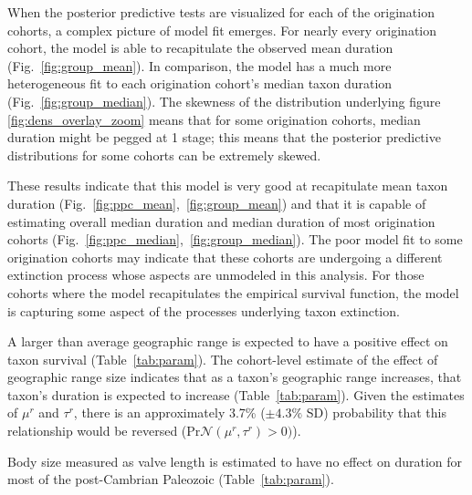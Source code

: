 \documentclass[11pt]{article}
\begin{document}
When the posterior predictive tests are visualized for each of the origination cohorts, a complex picture of model fit emerges. For nearly every origination cohort, the model is able to recapitulate the observed mean duration (Fig.~\ref{fig:group_mean}). In comparison, the model has a much more heterogeneous fit to each origination cohort's median taxon duration (Fig.~\ref{fig:group_median}). The skewness of the distribution underlying figure \ref{fig:dens_overlay_zoom} means that for some origination cohorts, median duration might be pegged at 1 stage; this means that the posterior predictive distributions for some cohorts can be extremely skewed. 

These results indicate that this model is very good at recapitulate mean taxon duration (Fig.~\ref{fig:ppc_mean},~\ref{fig:group_mean}) and that it is capable of estimating overall median duration and median duration of most origination cohorts (Fig.~\ref{fig:ppc_median},~\ref{fig:group_median}). The poor model fit to some origination cohorts may indicate that these cohorts are undergoing a different extinction process whose aspects are unmodeled in this analysis. For those cohorts where the model recapitulates the empirical survival function, the model is capturing some aspect of the processes underlying taxon extinction.


A larger than average geographic range is expected to have a positive effect on taxon survival (Table~\ref{tab:param}). The cohort-level estimate of the effect of geographic range size indicates that as a taxon's geographic range increases, that taxon's duration is expected to increase (Table~\ref{tab:param}). Given the estimates of \(\mu^{r}\) and \(\tau^{r}\), there is an approximately 3.7\% (\(\pm 4.3\%\) SD) probability that this relationship would be reversed (\(\mathrm{Pr}\mathcal{N}(\mu^{r}, \tau^{r}) > 0)\)). 

Body size measured as valve length is estimated to have no effect on duration for most of the post-Cambrian Paleozoic (Table~\ref{tab:param}).
\end{document}
